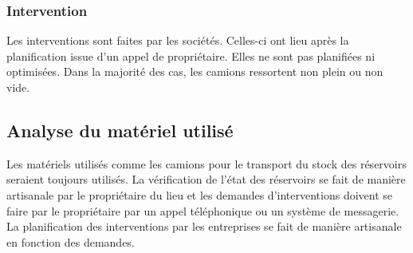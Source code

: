 \subsubsection{Intervention}

Les interventions sont faites par les sociétés. Celles-ci ont lieu après la planification issue d'un appel de propriétaire. Elles ne sont pas planifiées ni optimisées. Dans la majorité des cas, les camions ressortent non plein ou non vide.

\subsection{Analyse du matériel utilisé}

Les matériels utilisés comme les camions pour le transport du stock des réservoirs seraient toujours utilisés. La vérification de l'état des réservoirs se fait de manière artisanale par le propriétaire du lieu et les demandes d'interventions doivent se faire par le propriétaire par un appel téléphonique ou un système de messagerie. La planification des interventions par les entreprises se fait de manière artisanale en fonction des demandes.



\vfill
\pagebreak
